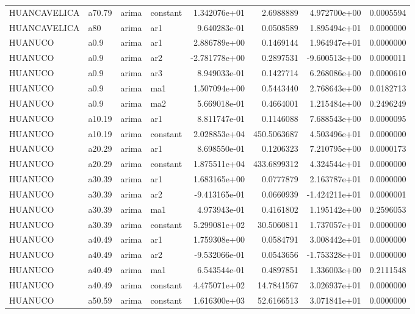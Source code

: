 \documentclass[
]{article}
\begin{document}
\begin{table}[!h]
\begin{tabular}[t]{llllrrrr}
HUANCAVELICA & a70.79 & arima & constant & 1.342076e+01 & 2.6988889 & 4.972700e+00 & 0.0005594\\
HUANCAVELICA & a80 & arima & ar1 & 9.640283e-01 & 0.0508589 & 1.895494e+01 & 0.0000000\\
HUANUCO & a0.9 & arima & ar1 & 2.886789e+00 & 0.1469144 & 1.964947e+01 & 0.0000000\\
\addlinespace
HUANUCO & a0.9 & arima & ar2 & -2.781778e+00 & 0.2897531 & -9.600513e+00 & 0.0000011\\
HUANUCO & a0.9 & arima & ar3 & 8.949033e-01 & 0.1427714 & 6.268086e+00 & 0.0000610\\
HUANUCO & a0.9 & arima & ma1 & 1.507094e+00 & 0.5443440 & 2.768643e+00 & 0.0182713\\
HUANUCO & a0.9 & arima & ma2 & 5.669018e-01 & 0.4664001 & 1.215484e+00 & 0.2496249\\
HUANUCO & a10.19 & arima & ar1 & 8.811747e-01 & 0.1146088 & 7.688543e+00 & 0.0000095\\
\addlinespace
HUANUCO & a10.19 & arima & constant & 2.028853e+04 & 450.5063687 & 4.503496e+01 & 0.0000000\\
HUANUCO & a20.29 & arima & ar1 & 8.698550e-01 & 0.1206323 & 7.210795e+00 & 0.0000173\\
HUANUCO & a20.29 & arima & constant & 1.875511e+04 & 433.6899312 & 4.324544e+01 & 0.0000000\\
HUANUCO & a30.39 & arima & ar1 & 1.683165e+00 & 0.0777879 & 2.163787e+01 & 0.0000000\\
HUANUCO & a30.39 & arima & ar2 & -9.413165e-01 & 0.0660939 & -1.424211e+01 & 0.0000001\\
\addlinespace
HUANUCO & a30.39 & arima & ma1 & 4.973943e-01 & 0.4161802 & 1.195142e+00 & 0.2596053\\
HUANUCO & a30.39 & arima & constant & 5.299081e+02 & 30.5060811 & 1.737057e+01 & 0.0000000\\
HUANUCO & a40.49 & arima & ar1 & 1.759308e+00 & 0.0584791 & 3.008442e+01 & 0.0000000\\
HUANUCO & a40.49 & arima & ar2 & -9.532066e-01 & 0.0543656 & -1.753328e+01 & 0.0000000\\
HUANUCO & a40.49 & arima & ma1 & 6.543544e-01 & 0.4897851 & 1.336003e+00 & 0.2111548\\
\addlinespace
HUANUCO & a40.49 & arima & constant & 4.475071e+02 & 14.7841567 & 3.026937e+01 & 0.0000000\\
HUANUCO & a50.59 & arima & constant & 1.616300e+03 & 52.6166513 & 3.071841e+01 & 0.0000000\\

\end{tabular}
\end{table}
\end{document}
